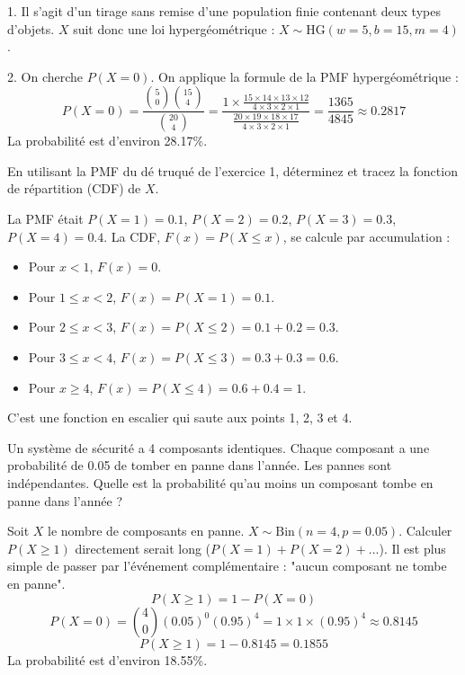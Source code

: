\begin{correctionbox}
1. Il s'agit d'un tirage sans remise d'une population finie contenant deux types d'objets. $X$ suit donc une loi hypergéométrique : $X \sim \text{HG}(w=5, b=15, m=4)$.

2. On cherche $P(X=0)$. On applique la formule de la PMF hypergéométrique :
$$ P(X=0) = \frac{\binom{5}{0} \binom{15}{4}}{\binom{20}{4}} = \frac{1 \times \frac{15 \times 14 \times 13 \times 12}{4 \times 3 \times 2 \times 1}}{\frac{20 \times 19 \times 18 \times 17}{4 \times 3 \times 2 \times 1}} = \frac{1365}{4845} \approx 0.2817 $$
La probabilité est d'environ 28.17\%.
\end{correctionbox}

\begin{exercicebox}[CDF]
En utilisant la PMF du dé truqué de l'exercice 1, déterminez et tracez la fonction de répartition (CDF) de $X$.
\end{exercicebox}

\begin{correctionbox}
La PMF était $P(X=1)=0.1$, $P(X=2)=0.2$, $P(X=3)=0.3$, $P(X=4)=0.4$.
La CDF, $F(x)=P(X \le x)$, se calcule par accumulation :
\begin{itemize}
    \item Pour $x < 1$, $F(x) = 0$.
    \item Pour $1 \le x < 2$, $F(x) = P(X=1) = 0.1$.
    \item Pour $2 \le x < 3$, $F(x) = P(X \le 2) = 0.1 + 0.2 = 0.3$.
    \item Pour $3 \le x < 4$, $F(x) = P(X \le 3) = 0.3 + 0.3 = 0.6$.
    \item Pour $x \ge 4$, $F(x) = P(X \le 4) = 0.6 + 0.4 = 1$.
\end{itemize}
C'est une fonction en escalier qui saute aux points 1, 2, 3 et 4.
\end{correctionbox}

\begin{exercicebox}
Un système de sécurité a 4 composants identiques. Chaque composant a une probabilité de 0.05 de tomber en panne dans l'année. Les pannes sont indépendantes. Quelle est la probabilité qu'au moins un composant tombe en panne dans l'année ?
\end{exercicebox}

\begin{correctionbox}
Soit $X$ le nombre de composants en panne. $X \sim \text{Bin}(n=4, p=0.05)$.
Calculer $P(X \ge 1)$ directement serait long ($P(X=1)+P(X=2)+...$). Il est plus simple de passer par l'événement complémentaire : "aucun composant ne tombe en panne".
$$ P(X \ge 1) = 1 - P(X=0) $$
$$ P(X=0) = \binom{4}{0} (0.05)^0 (0.95)^4 = 1 \times 1 \times (0.95)^4 \approx 0.8145 $$
$$ P(X \ge 1) = 1 - 0.8145 = 0.1855 $$
La probabilité est d'environ 18.55\%.
\end{correctionbox}

